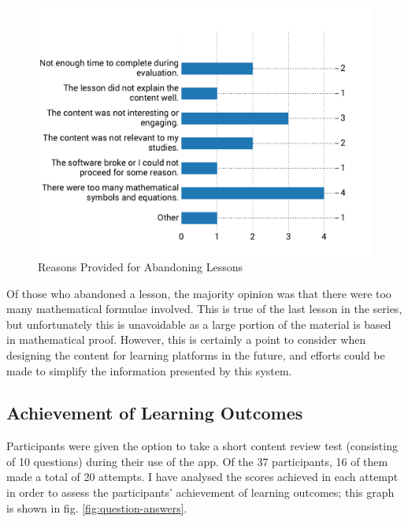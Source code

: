 \documentclass[bsc,twoside,singlespacing,parskip,logo,notimes,normalheadings]{infthesis}
\begin{document}
    \begin{figure}[!htb]
      \centering
      \vspace{-2mm}
      \includegraphics[width=\textwidth, trim=0 20 0 75, clip]{img/lesson_leaving.pdf}
      \captionsetup{width=\textwidth, justification=centering}
      \caption{Reasons Provided for Abandoning Lessons}\label{fig:lesson-stay}
    \end{figure}

    Of those who abandoned a lesson, the majority opinion was that
    there were too many mathematical formulae involved. This is true
    of the last lesson in the series, but unfortunately this is
    unavoidable as a large portion of the material is based in
    mathematical proof. However, this is certainly a point to consider
    when designing the content for learning platforms in the future,
    and efforts could be made to simplify the information presented by
    this system.

    \subsection{Achievement of Learning Outcomes}
    Participants were given the option to take a short content review
    test (consisting of 10 questions) during their use of the app. Of
    the 37 participants, 16 of them made a total of 20 attempts. I
    have analysed the scores achieved in each attempt in order to
    assess the participants' achievement of learning outcomes; this
    graph is shown in fig. \ref{fig:question-answers}.
\end{document}
